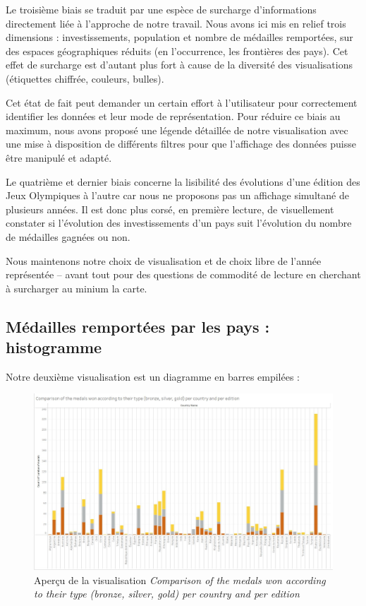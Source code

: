 \documentclass[hidelinks, 12pt]{report}
\begin{document}
Le troisième biais se traduit par une espèce de surcharge d'informations directement liée à l'approche de notre travail. Nous avons ici mis en relief trois dimensions : investissements, population et nombre de médailles remportées, sur des espaces géographiques réduits (en l'occurrence, les frontières des pays). Cet effet de surcharge est d'autant plus fort à cause de la diversité des visualisations (étiquettes chiffrée, couleurs, bulles).

Cet état de fait peut demander un certain effort à l'utilisateur pour correctement identifier les données et leur mode de représentation. Pour réduire ce biais au maximum, nous avons proposé une légende détaillée de notre visualisation avec une mise à disposition de différents filtres pour que l'affichage des données puisse être manipulé et adapté.

Le quatrième et dernier biais concerne la lisibilité des évolutions d'une édition des Jeux Olympiques à l'autre car nous ne proposons pas un affichage simultané de plusieurs années. Il est donc plus corsé, en première lecture, de visuellement constater si l'évolution des investissements d'un pays suit l'évolution du nombre de médailles gagnées ou non.

Nous maintenons notre choix de visualisation et de choix libre de l'année représentée -- avant tout pour des questions de commodité de lecture en cherchant à surcharger au minium la carte.





%





\subsection{Médailles remportées par les pays : histogramme}

Notre deuxième visualisation est un diagramme en barres empilées :

\begin{center}
	\begin{figure}[H]
		\setlength{\belowcaptionskip}{-35pt}
		\includegraphics[scale=0.3]{images/datavis-medals-world-histo.jpeg}
		\caption{Aperçu de la visualisation \textit{Comparison of the medals won according to their type (bronze, silver, gold) per country and per edition}}
	\end{figure}
\end{center}
\end{document}
